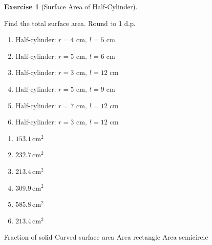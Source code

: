 \documentclass[
  letterpaper,
  DIV=11,
  numbers=noendperiod]{scrreprt}
\theoremstyle{definition}
\newtheorem{exercise}{Exercise}[chapter]
\theoremstyle{remark}
\begin{document}
\begin{exercise}[Surface Area of
Half-Cylinder]\protect\hypertarget{exr-sa-9}{}\label{exr-sa-9}

Find the total surface area. Round to 1 d.p.

\begin{enumerate}
\def\labelenumi{\alph{enumi})}
\item
  \(\text{Half-cylinder: }r=4\text{ cm},\ l=5\text{ cm}\)
\item
  \(\text{Half-cylinder: }r=5\text{ cm},\ l=6\text{ cm}\)
\item
  \(\text{Half-cylinder: }r=3\text{ cm},\ l=12\text{ cm}\)
\item
  \(\text{Half-cylinder: }r=5\text{ cm},\ l=9\text{ cm}\)
\item
  \(\text{Half-cylinder: }r=7\text{ cm},\ l=12\text{ cm}\)
\item
  \(\text{Half-cylinder: }r=3\text{ cm},\ l=12\text{ cm}\)
\end{enumerate}

\begin{tcolorbox}[enhanced jigsaw, opacitybacktitle=0.6, coltitle=black, arc=.35mm, colframe=quarto-callout-tip-color-frame, colback=white, bottomrule=.15mm, left=2mm, colbacktitle=quarto-callout-tip-color!10!white, titlerule=0mm, opacityback=0, title=\textcolor{quarto-callout-tip-color}{\faLightbulb}\hspace{0.5em}{🔍 View Solution}, leftrule=.75mm, breakable, rightrule=.15mm, bottomtitle=1mm, toptitle=1mm, toprule=.15mm]

\begin{enumerate}
\def\labelenumi{\alph{enumi})}
\item
  \(153.1\,\text{cm}^{2}\)
\item
  \(232.7\,\text{cm}^{2}\)
\item
  \(213.4\,\text{cm}^{2}\)
\item
  \(309.9\,\text{cm}^{2}\)
\item
  \(585.8\,\text{cm}^{2}\)
\item
  \(213.4\,\text{cm}^{2}\)
\end{enumerate}

\end{tcolorbox}

{Fraction of solid} {Curved surface area} {Area rectangle} {Area
semicircle}

\end{exercise}
\end{document}
